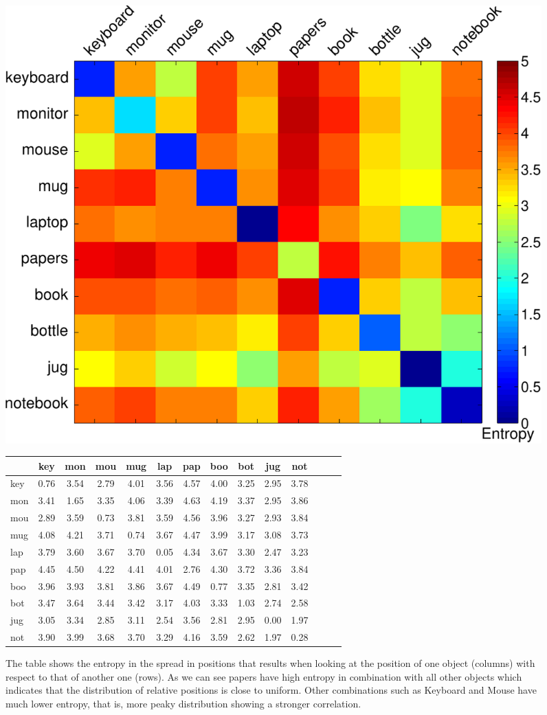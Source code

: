\documentclass[letterpaper, 10 pt, conference]{ieeeconf}  %
\begin{document}
\begin{figure}
\begin{center}
\includegraphics[width=0.5\linewidth]{entropy_matrix-crop} \quad
\begin{tabular}{|l||c|c|c|c|c|c|c|c|c|c|c|c|c|}
\hline
& key & mon & mou & mug & lap & pap & boo & bot & jug & not \\ \hline \hline
key & 0.76 & 3.54 & 2.79 & 4.01 & 3.56 & 4.57 & 4.00 & 3.25 & 2.95 & 3.78\\ \hline
mon & 3.41 & 1.65 & 3.35 & 4.06 & 3.39 & 4.63 & 4.19 & 3.37 & 2.95 & 3.86\\ \hline
mou & 2.89 & 3.59 & 0.73 & 3.81 & 3.59 & 4.56 & 3.96 & 3.27 & 2.93 & 3.84 \\ \hline
mug & 4.08 & 4.21 & 3.71 & 0.74 & 3.67 & 4.47 & 3.99 & 3.17 & 3.08 & 3.73 \\ \hline
lap & 3.79 & 3.60 & 3.67 & 3.70 & 0.05 & 4.34 & 3.67 & 3.30 & 2.47 & 3.23 \\ \hline
pap & 4.45 & 4.50 & 4.22 & 4.41 & 4.01 & 2.76 & 4.30 & 3.72 & 3.36 & 3.84 \\ \hline
boo & 3.96 & 3.93 & 3.81 & 3.86 & 3.67 & 4.49 & 0.77 & 3.35 & 2.81 & 3.42 \\ \hline
bot & 3.47 & 3.64 & 3.44 & 3.42 & 3.17 & 4.03 & 3.33 & 1.03 & 2.74 & 2.58 \\ \hline
jug & 3.05 & 3.34 & 2.85 & 3.11 & 2.54 & 3.56 & 2.81 & 2.95 & 0.00 & 1.97 \\ \hline
not & 3.90 & 3.99 & 3.68 & 3.70 & 3.29 & 4.16 & 3.59 & 2.62 & 1.97 & 0.28 \\ \hline
\end{tabular}
\caption{The table shows the entropy in the spread in positions that results when looking at the position of one object (columns) with respect to that of another one (rows). As we can see papers have high entropy in combination with all other objects which indicates that the distribution of relative positions is close to uniform. Other combinations such as Keyboard and Mouse have much lower entropy, that is, more peaky distribution showing a stronger correlation.}
\label{fig:entropy}
\end{center}
\end{figure}
\end{document}
